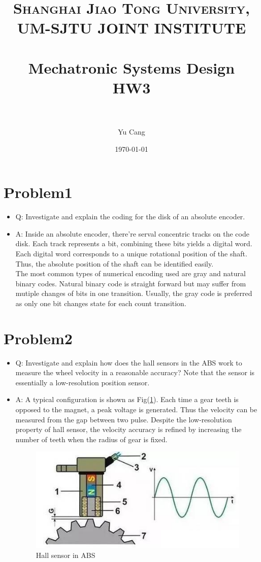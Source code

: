\documentclass[paper=a4, fontsize=11pt]{scrartcl} %
\title{	
\normalfont \normalsize 
\textsc{Shanghai Jiao Tong University, UM-SJTU JOINT INSTITUTE} \\ [25pt] %
\horrule{0.5pt} \\[0.4cm] %
\huge Mechatronic Systems Design\\ HW3 \\ %
\horrule{2pt} \\[0.5cm] %
}
\author{Yu Cang \quad 018370210001} %
\date{\normalsize \today} %
\numberwithin{equation}{section} %
\numberwithin{figure}{section} %
\numberwithin{table}{section} %
\begin{document}
\maketitle %

\section*{Problem1}
	\begin{itemize}
		\item Q: Investigate and explain the coding for the disk of an absolute encoder.
		
		\item A: Inside an absolute encoder, there're serval concentric tracks on the code disk.
				 Each track represents a bit, combining these bits yields a digital word. 
		Each digital word corresponds to a unique rotational position of the shaft. 
		Thus, the absolute position of the shaft can be identified easily.\\
		The most common types of numerical encoding used are gray and natural binary codes. Natural binary code is straight forward but may suffer from mutiple changes of bits in one transition. Usually, the gray code is preferred as only one bit changes state for each count transition. 
		
	\end{itemize}

\section*{Problem2}
	\begin{itemize}
		\item 
			Q: Investigate and explain how does the hall sensors in the ABS work to measure the wheel velocity in a reasonable accuracy? Note that the sensor is essentially a low-resolution position sensor.
		
		\item 
			A: A typical configuration is shown as Fig(\ref{fig:hall}). Each time a gear teeth is opposed to the magnet, a peak voltage is generated. Thus the velocity can be measured from the gap between two pulse. Despite the low-resolution property of hall sensor, the velocity accuracy is refined by increasing the number of teeth when the radius of gear is fixed.
			
			\begin{figure}[!htbp]
				\centering
				\includegraphics{hall.jpeg}
				\caption{Hall sensor in ABS}
				\label{fig:hall}
			\end{figure}

		
	\end{itemize}
\end{document}
